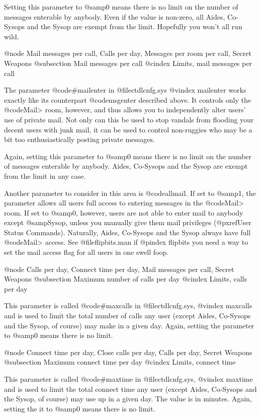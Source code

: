 Setting this parameter to @samp{0} means there is no
limit on the number of messages enterable by anybody.
Even if the value is non-zero, all Aides, Co-Sysops and the Sysop are
exempt from the limit.  Hopefully you won't all run wild.

@node Mail messages per call, Calls per day, Messages per room per call, Secret Weapons
@subsection Mail messages per call
@cindex Limits, mail messages per call

The parameter @code{#mailenter} in @file{ctdlcnfg.sys}
@vindex mailenter
works exactly like its counterpart @code{msgenter} described above.
It controls only the @code{Mail>} room, however, and thus allows you
to independently alter users' use of private mail.  Not only
can this be used to stop vandals from flooding your decent
users with junk mail, it can be used to control non-ruggies
who may be a bit too enthusiastically posting private messages.

Again, setting this parameter to @samp{0} means there is no
limit on the number of messages enterable by anybody.  Aides, Co-Sysops
and the Sysop are exempt from the limit in any case.

Another parameter to consider in this area is @code{allmail}.
If set to @samp{1}, the parameter allows all users full access to
entering messages in the @code{Mail>} room.  If set to @samp{0}, however,
users are not able to enter mail to anybody except @samp{Sysop},
unless you manually give them mail privileges (@pxref{User Status Commands}).
Naturally, Aides, Co-Sysops and the Sysop always
have full @code{Mail>} access.  See @file{flipbits.man} if
@pindex flipbits
you need a way to set
the mail access flag for all users in one swell foop.

@node Calls per day, Connect time per day, Mail messages per call, Secret Weapons
@subsection Maximum number of calls per day
@cindex Limits, calls per day

This parameter is called @code{#maxcalls} in @file{ctdlcnfg.sys},
@vindex maxcalls
and is used to limit the total number of calls any user (except
Aides, Co-Sysops and the Sysop, of course) may make in a given day.  Again,
setting the parameter to @samp{0} means there is no limit.

@node Connect time per day, Close calls per day, Calls per day, Secret Weapons
@subsection Maximum connect time per day
@cindex Limits, connect time

This parameter is called @code{#maxtime} in @file{ctdlcnfg.sys},
@vindex maxtime
and is used to limit the total connect time any user (except
Aides, Co-Sysops and the Sysop, of course) may use up in a given day.  The
value is in minutes.  Again, setting the it to @samp{0} means there
is no limit.

